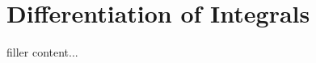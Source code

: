 \documentclass[../../templates/section]{subfiles}
\begin{document}
\section{Differentiation of Integrals}\label{sec:differentiation-of-integrals}

filler content...
\end{document}

